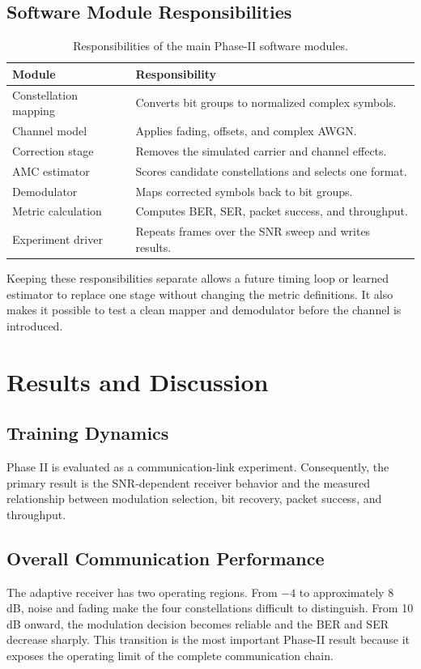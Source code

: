 \documentclass[12pt,twoside,openright]{report}
\begin{document}
\section{Software Module Responsibilities}
\begin{table}[htbp]
\centering
\small
\caption{Responsibilities of the main Phase-II software modules.}
\label{tab:modules}
\begin{tabular}{p{} p{}}
\toprule
\textbf{Module} & \textbf{Responsibility}\\
\midrule
Constellation mapping & Converts bit groups to normalized complex symbols.\\
Channel model & Applies fading, offsets, and complex AWGN.\\
Correction stage & Removes the simulated carrier and channel effects.\\
AMC estimator & Scores candidate constellations and selects one format.\\
Demodulator & Maps corrected symbols back to bit groups.\\
Metric calculation & Computes BER, SER, packet success, and throughput.\\
Experiment driver & Repeats frames over the SNR sweep and writes results.\\
\bottomrule
\end{tabular}
\end{table}

Keeping these responsibilities separate allows a future timing loop or
learned estimator to replace one stage without changing the metric
definitions. It also makes it possible to test a clean mapper and
demodulator before the channel is introduced.

\chapter{Results and Discussion}

\section{Training Dynamics}
Phase II is evaluated as a communication-link experiment. Consequently, the
primary result is the SNR-dependent receiver behavior and the measured
relationship between modulation selection, bit recovery, packet success,
and throughput.

\section{Overall Communication Performance}
The adaptive receiver has two operating regions. From $-4$ to approximately
8 dB, noise and fading make the four constellations difficult to distinguish.
From 10 dB onward, the modulation decision becomes reliable and the BER and
SER decrease sharply. This transition is the most important Phase-II result
because it exposes the operating limit of the complete communication chain.
\end{document}
